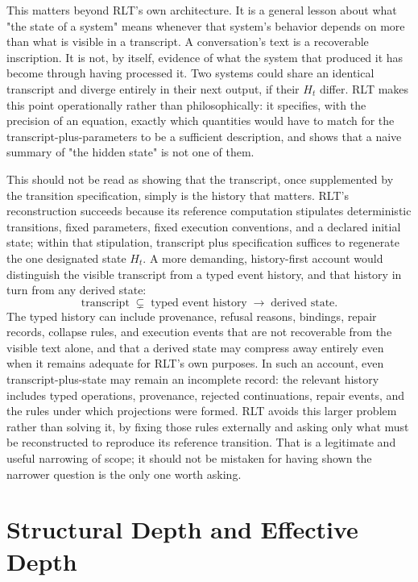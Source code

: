 \documentclass[11pt]{article}
\begin{document}
This matters beyond RLT's own architecture. It is a general lesson about what "the state of a system" means whenever that system's behavior depends on more than what is visible in a transcript. A conversation's text is a recoverable inscription. It is not, by itself, evidence of what the system that produced it has become through having processed it. Two systems could share an identical transcript and diverge entirely in their next output, if their $H_t$ differ. RLT makes this point operationally rather than philosophically: it specifies, with the precision of an equation, exactly which quantities would have to match for the transcript-plus-parameters to be a sufficient description, and shows that a naive summary of "the hidden state" is not one of them.

This should not be read as showing that the transcript, once supplemented by the transition specification, simply is the history that matters. RLT's reconstruction succeeds because its reference computation stipulates deterministic transitions, fixed parameters, fixed execution conventions, and a declared initial state; within that stipulation, transcript plus specification suffices to regenerate the one designated state $H_t$. A more demanding, history-first account would distinguish the visible transcript from a typed event history, and that history in turn from any derived state:
\[
\text{transcript} \;\subsetneq\; \text{typed event history} \;\longrightarrow\; \text{derived state}.
\]
The typed history can include provenance, refusal reasons, bindings, repair records, collapse rules, and execution events that are not recoverable from the visible text alone, and that a derived state may compress away entirely even when it remains adequate for RLT's own purposes. In such an account, even transcript-plus-state may remain an incomplete record: the relevant history includes typed operations, provenance, rejected continuations, repair events, and the rules under which projections were formed. RLT avoids this larger problem rather than solving it, by fixing those rules externally and asking only what must be reconstructed to reproduce its reference transition. That is a legitimate and useful narrowing of scope; it should not be mistaken for having shown the narrower question is the only one worth asking.

\section{Structural Depth and Effective Depth}
\end{document}
